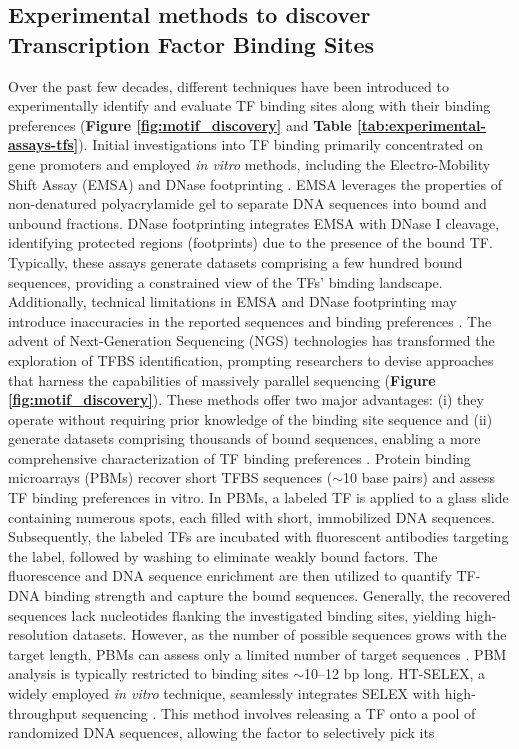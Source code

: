 \documentclass[a4paper, titlepage, openright]{book}
\begin{document}
\subsection{Experimental methods to discover Transcription Factor Binding Sites}
Over the past few decades, different techniques have been introduced to experimentally identify and evaluate TF binding sites along with their binding preferences \citep{jolma2011methods} (\textbf{Figure \ref{fig:motif_discovery}} and \textbf{Table \ref{tab:experimental-assays-tfs}}). Initial investigations into TF binding primarily concentrated on gene promoters \citep{stormo2000dna} and employed \emph{in vitro} methods, including the Electro-Mobility Shift Assay (EMSA) \citep{garner1981gel} and DNase footprinting \citep{galas1978dnaase}. EMSA leverages the properties of non-denatured polyacrylamide gel to separate DNA sequences into bound and unbound fractions. DNase footprinting integrates EMSA with DNase I cleavage, identifying protected regions (footprints) due to the presence of the bound TF. Typically, these assays generate datasets comprising a few hundred bound sequences, providing a constrained view of the TFs' binding landscape. Additionally, technical limitations in EMSA and DNase footprinting may introduce inaccuracies in the reported sequences and binding preferences \citep{jolma2011methods}. The advent of Next-Generation Sequencing (NGS) technologies has transformed the exploration of TFBS identification, prompting researchers to devise approaches that harness the capabilities of massively parallel sequencing (\textbf{Figure \ref{fig:motif_discovery}}). These methods offer two major advantages: (i) they operate without requiring prior knowledge of the binding site sequence \citep{jolma2011methods, zia2012towards} and (ii) generate datasets comprising thousands of bound sequences, enabling a more comprehensive characterization of TF binding preferences \citep{stormo2010determining}. Protein binding microarrays (PBMs) \citep{berger2006compact,berger2009universal} recover short TFBS sequences ($\sim$10 base pairs) and assess TF binding preferences in vitro. In PBMs, a labeled TF is applied to a glass slide containing numerous spots, each filled with short, immobilized DNA sequences. Subsequently, the labeled TFs are incubated with fluorescent antibodies targeting the label, followed by washing to eliminate weakly bound factors. The fluorescence and DNA sequence enrichment are then utilized to quantify TF-DNA binding strength and capture the bound sequences. Generally, the recovered sequences lack nucleotides flanking the investigated binding sites, yielding high-resolution datasets. However, as the number of possible sequences grows with the target length, PBMs can assess only a limited number of target sequences \citep{jolma2011methods, zia2012towards}. PBM analysis is typically restricted to binding sites $\sim$10–12 bp long. HT-SELEX, a widely employed \emph{in vitro} technique, seamlessly integrates SELEX with high-throughput sequencing \citep{jolma2011methods,jolma2010multiplexed}. This method involves releasing a TF onto a pool of randomized DNA sequences, allowing the factor to selectively pick its 
\end{document}
